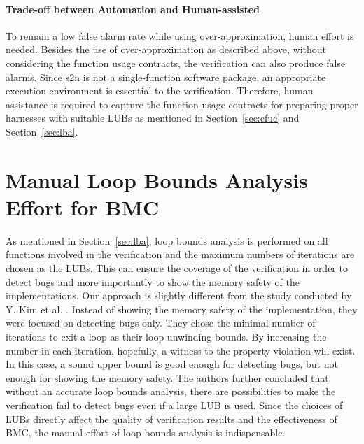 \paragraph{Trade-off between Automation and Human-assisted} To remain a low false alarm rate while using over-approximation, human effort is needed. Besides the use of over-approximation as described above, without considering the function usage contracts, the verification can also produce false alarms. Since s2n is not a single-function software package, an appropriate execution environment is essential to the verification. Therefore, human assistance is required to capture the function usage contracts for preparing proper harnesses with suitable LUBs as mentioned in Section~\ref{sec:cfuc} and Section~\ref{sec:lba}.

\section{Manual Loop Bounds Analysis Effort for BMC}
As mentioned in Section~\ref{sec:lba}, loop bounds analysis is performed on all functions involved in the verification and the maximum numbers of iterations are chosen as the LUBs. This can ensure the coverage of the verification in order to detect bugs and more importantly to show the memory safety of the implementations. Our approach is slightly different from the study conducted by Y. Kim et al. \cite{7091291}. Instead of showing the memory safety of the implementation, they were focused on detecting bugs only. They chose the minimal number of iterations to exit a loop as their loop unwinding bounds. By increasing the number in each iteration, hopefully, a witness to the property violation will exist. In this case, a sound upper bound is good enough for detecting bugs, but not enough for showing the memory safety. The authors further concluded that without an accurate loop bounds analysis, there are possibilities to make the verification fail to detect bugs even if a large LUB is used. Since the choices of LUBs directly affect the quality of verification results and the effectiveness of BMC, the manual effort of loop bounds analysis is indispensable.


